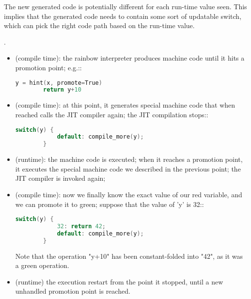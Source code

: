 The new generated code is potentially different for each run-time value
seen.  This implies that the generated code needs to contain some sort
of updatable switch, which can pick the right code path based on the
run-time value.

.

\begin{itemize}
  \item (compile time): the rainbow interpreter produces machine code until it
    hits a promotion point; e.g.::

    \begin{lstlisting}[language=C]
        y = hint(x, promote=True)
        return y+10
    \end{lstlisting}

  \item (compile time): at this point, it generates special machine code that when
    reached calls the JIT compiler again; the JIT compilation stops::

    \begin{lstlisting}[language=C]
        switch(y) {
            default: compile_more(y);
        }
    \end{lstlisting}

  \item (runtime): the machine code is executed; when it reaches a promotion
    point, it executes the special machine code we described in the previous
    point; the JIT compiler is invoked again;

  \item (compile time): now we finally know the exact value of our red variable,
    and we can promote it to green; suppose that the value of 'y' is 32::

    \begin{lstlisting}[language=C]
        switch(y) {
            32: return 42;
            default: compile_more(y);
        }
    \end{lstlisting}

    Note that the operation "y+10" has been constant-folded into "42", as it
    was a green operation.

  \item (runtime) the execution restart from the point it stopped, until a new
    unhandled promotion point is reached.
\end{itemize}

